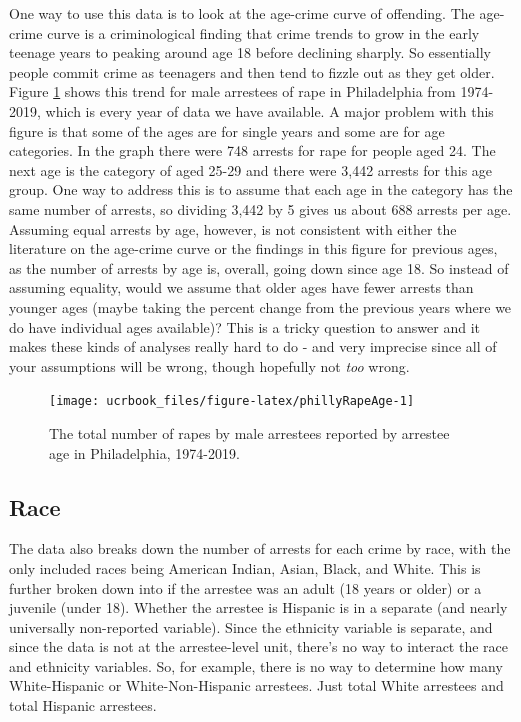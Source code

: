 \documentclass[
  12pt,
  openany]{book}
\begin{document}
One way to use this data is to look at the age-crime curve of offending. The age-crime curve is a criminological finding that crime trends to grow in the early teenage years to peaking around age 18 before declining sharply. So essentially people commit crime as teenagers and then tend to fizzle out as they get older. Figure \ref{fig:phillyRapeAge} shows this trend for male arrestees of rape in Philadelphia from 1974-2019, which is every year of data we have available. A major problem with this figure is that some of the ages are for single years and some are for age categories. In the graph there were 748 arrests for rape for people aged 24. The next age is the category of aged 25-29 and there were 3,442 arrests for this age group. One way to address this is to assume that each age in the category has the same number of arrests, so dividing 3,442 by 5 gives us about 688 arrests per age. Assuming equal arrests by age, however, is not consistent with either the literature on the age-crime curve or the findings in this figure for previous ages, as the number of arrests by age is, overall, going down since age 18. So instead of assuming equality, would we assume that older ages have fewer arrests than younger ages (maybe taking the percent change from the previous years where we do have individual ages available)? This is a tricky question to answer and it makes these kinds of analyses really hard to do - and very imprecise since all of your assumptions will be wrong, though hopefully not \emph{too} wrong.

\begin{figure}

{\centering \texttt{[image: ucrbook\_files/figure-latex/phillyRapeAge-1]} 

}

\caption{The total number of rapes by male arrestees reported by arrestee age in Philadelphia, 1974-2019.}\label{fig:phillyRapeAge}
\end{figure}

\hypertarget{race}{%
\subsection{Race}\label{race}}

The data also breaks down the number of arrests for each crime by race, with the only included races being American Indian, Asian, Black, and White. This is further broken down into if the arrestee was an adult (18 years or older) or a juvenile (under 18). Whether the arrestee is Hispanic is in a separate (and nearly universally non-reported variable). Since the ethnicity variable is separate, and since the data is not at the arrestee-level unit, there's no way to interact the race and ethnicity variables. So, for example, there is no way to determine how many White-Hispanic or White-Non-Hispanic arrestees. Just total White arrestees and total Hispanic arrestees.
\end{document}
